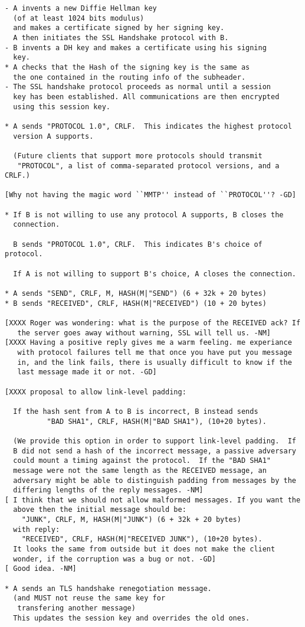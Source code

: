 \begin{verbatim}
- A invents a new Diffie Hellman key 
  (of at least 1024 bits modulus)
  and makes a certificate signed by her signing key.
  A then initiates the SSL Handshake protocol with B.
- B invents a DH key and makes a certificate using his signing
  key.
* A checks that the Hash of the signing key is the same as
  the one contained in the routing info of the subheader.
- The SSL handshake protocol proceeds as normal until a session
  key has been established. All communications are then encrypted
  using this session key.

* A sends "PROTOCOL 1.0", CRLF.  This indicates the highest protocol
  version A supports.

  (Future clients that support more protocols should transmit
   "PROTOCOL", a list of comma-separated protocol versions, and a CRLF.)

[Why not having the magic word ``MMTP'' instead of ``PROTOCOL''? -GD]

* If B is not willing to use any protocol A supports, B closes the 
  connection.

  B sends "PROTOCOL 1.0", CRLF.  This indicates B's choice of protocol.

  If A is not willing to support B's choice, A closes the connection.

* A sends "SEND", CRLF, M, HASH(M|"SEND") (6 + 32k + 20 bytes)
* B sends "RECEIVED", CRLF, HASH(M|"RECEIVED") (10 + 20 bytes)

[XXXX Roger was wondering: what is the purpose of the RECEIVED ack? If
   the server goes away without warning, SSL will tell us. -NM]
[XXXX Having a positive reply gives me a warm feeling. me experiance
   with protocol failures tell me that once you have put you message
   in, and the link fails, there is usually difficult to know if the
   last message made it or not. -GD]

[XXXX proposal to allow link-level padding:

  If the hash sent from A to B is incorrect, B instead sends
          "BAD SHA1", CRLF, HASH(M|"BAD SHA1"), (10+20 bytes).

  (We provide this option in order to support link-level padding.  If
  B did not send a hash of the incorrect message, a passive adversary
  could mount a timing against the protocol.  If the "BAD SHA1"
  message were not the same length as the RECEIVED message, an
  adversary might be able to distinguish padding from messages by the
  differing lengths of the reply messages. -NM]
[ I think that we should not allow malformed messages. If you want the
  above then the initial message should be:
	"JUNK", CRLF, M, HASH(M|"JUNK") (6 + 32k + 20 bytes)
  with reply:
	"RECEIVED", CRLF, HASH(M|"RECEIVED JUNK"), (10+20 bytes).
  It looks the same from outside but it does not make the client
  wonder, if the corruption was a bug or not. -GD]
[ Good idea. -NM]

* A sends an TLS handshake renegotiation message.
  (and MUST not reuse the same key for 
   transfering another message)
  This updates the session key and overrides the old ones.
\end{verbatim}

